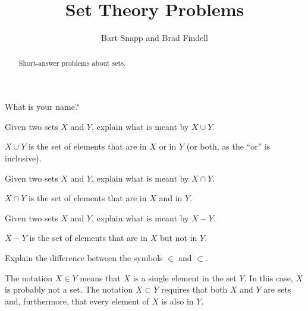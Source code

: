 \documentclass[nooutcomes]{ximera}
\title{Set Theory Problems}
\author{Bart Snapp and Brad Findell}
\begin{document}
\begin{abstract}
Short-answer problems about sets. 
\end{abstract}
\maketitle

\begin{question}
What is your name?
\begin{freeResponse}
\end{freeResponse}
\end{question}

\begin{problem}
Given two sets $X$ and $Y$, explain what is meant by $X\cup Y$.
\begin{freeResponse}
\begin{hint}
$X\cup Y$ is the set of elements that are in $X$ or in $Y$ (or both, as the ``or'' is inclusive).  
\end{hint}
\end{freeResponse}
\end{problem}

\begin{problem}
Given two sets $X$ and $Y$, explain what is meant by $X\cap Y$.
\begin{freeResponse}
\begin{hint}
$X\cap Y$ is the set of elements that are in $X$ and in $Y$.  
\end{hint}
\end{freeResponse}
\end{problem}

\begin{problem}
Given two sets $X$ and $Y$, explain what is meant by $X - Y$.
\begin{freeResponse}
\begin{hint}
$X - Y$ is the set of elements that are in $X$ but not in $Y$.  
\end{hint}
\end{freeResponse}
\end{problem}

\begin{problem}
Explain the difference between the symbols $\in$ and $\subset$.
\begin{freeResponse}
\begin{hint}
The notation $X \in Y$ means that $X$ is a single element in the set $Y$.  In this case, $X$ is probably not a set.  The notation $X \subset Y$ requires that both $X$ and $Y$ are sets and, furthermore, that every element of $X$ is also in $Y$.
\end{hint}
\end{freeResponse}
\end{problem}
\end{document}
